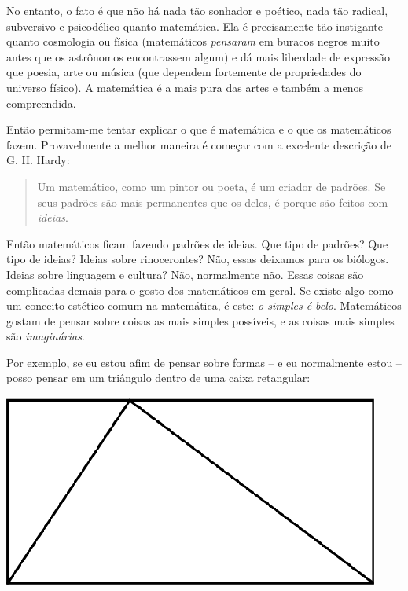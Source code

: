 \documentclass[a4paper,oneside,12pt,notitlepage]{article}
\begin{document}
No entanto, o fato é que não há nada tão sonhador e poético, nada tão radical, subversivo e psicodélico quanto matemática.
Ela é precisamente tão instigante quanto cosmologia ou física (matemáticos \textsl{pensaram} em buracos negros muito antes que os astrônomos encontrassem algum) e dá mais liberdade de expressão que poesia, arte ou música (que dependem fortemente de propriedades do universo físico).
A matemática é a mais pura das artes e também a menos compreendida.

Então permitam-me tentar explicar o que é matemática e o que os matemáticos fazem.
Provavelmente a melhor maneira é começar com a excelente descrição de G. H. Hardy:

\begin{quote}
Um matemático, como um pintor ou poeta, é um criador de padrões.
Se seus padrões são mais permanentes que os deles, é porque são feitos com \textsl{ideias}.
\end{quote}

Então matemáticos ficam fazendo padrões de ideias.
Que tipo de padrões? Que tipo de ideias?
Ideias sobre rinocerontes? Não, essas deixamos para os biólogos.
Ideias sobre linguagem e cultura? Não, normalmente não.
Essas coisas são complicadas demais para o gosto dos matemáticos em geral.
Se existe algo como um conceito estético comum na matemática, é este: \textsl{o simples é belo}.
Matemáticos gostam de pensar sobre coisas as mais simples possíveis, e as coisas mais simples são \textsl{imaginárias}.

Por exemplo, se eu estou afim de pensar sobre formas -- e eu normalmente estou -- posso pensar em um triângulo dentro de uma caixa retangular:

\begin{center}
\includegraphics{triangle0.eps}
\end{center}
\end{document}
